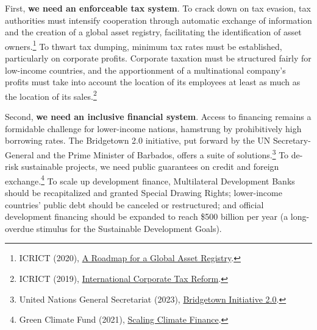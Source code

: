\documentclass[a5paper,english,openany]{memoir}
\begin{document}
First, \textbf{we need an enforceable tax system}. To crack down on tax evasion, tax authorities must intensify cooperation through automatic exchange of information and the creation of a global asset registry, facilitating the identification of asset owners.\footnote{ICRICT (2020), \href{https://static1.squarespace.com/static/5a0c602bf43b5594845abb81/t/5c988368eef1a1538c2ae7eb/1553498989927/GAR.pdf}{A Roadmap for a Global Asset Registry}.} 
To thwart tax dumping, minimum tax rates must be established, particularly on corporate profits. Corporate taxation must be structured fairly for low-income countries, and the apportionment of a multinational company's profits must take into account the location of its employees at least as much as the location of its sales.\footnote{ICRICT (2019), \href{https://static1.squarespace.com/static/5a0c602bf43b5594845abb81/t/5d979e6dc5f7cb7b66842c49/1570217588721/ICRICT-INTERNATIONAL+CORPORATE+TAX+REFORM.pdf}{International Corporate Tax Reform}.}%

Second, \textbf{we need an inclusive financial system}. Access to financing remains a formidable challenge for lower-income nations, hamstrung by prohibitively high borrowing rates. The Bridgetown 2.0 initiative, put forward by the UN Secretary-General and the Prime Minister of Barbados, offers a suite of solutions.\footnote{United Nations General Secretariat (2023), \href{https://www.un.org/sustainabledevelopment/blog/2023/04/press-release-with-clock-ticking-for-the-sdgs-un-chief-and-barbados-prime-minister-call-for-urgent-action-to-transform-broken-global-financial-system/}{Bridgetown Initiative 2.0}.} %
To de-risk sustainable projects, we need public guarantees on credit and foreign exchange.\footnote{Green Climate Fund (2021), \href{https://www.greenclimate.fund/sites/default/files/document/scaling-climate-finance-context-covid-19-full-report\_0.pdf}{Scaling Climate Finance}.} 
To scale up development finance, Multilateral Development Banks should be recapitalized and granted Special Drawing Rights; lower-income countries' public debt should be canceled %
or restructured; and official development financing should be expanded to reach \$500 billion per year (a long-overdue stimulus for the Sustainable Development Goals). %
\end{document}
